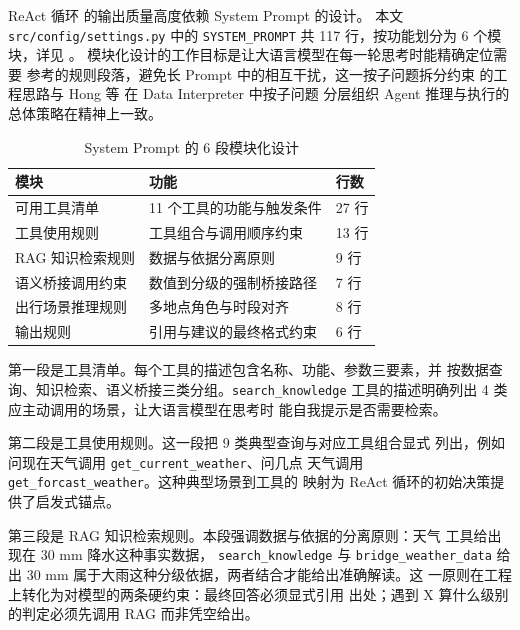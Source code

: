 ReAct 循环 \cite{ref18} 的输出质量高度依赖 System Prompt 的设计。
本文 \texttt{src/\bk{}config/\bk{}settings.\bk{}py} 中的 \texttt{SYSTEM\_\bk{}PROMPT}
共 117 行，按功能划分为 6 个模块，详见 。
模块化设计的工作目标是让大语言模型在每一轮思考时能精确定位需要
参考的规则段落，避免长 Prompt 中的相互干扰，这一按子问题拆分约束
的工程思路与 Hong 等 \cite{ref20} 在 Data Interpreter 中按子问题
分层组织 Agent 推理与执行的总体策略在精神上一致。

\begin{table}[!ht]
    \centering
    \caption{System Prompt 的 6 段模块化设计}
    \label{tab:prompt-modules}
    \song\fontsize{9pt}{12pt}\selectfont
    \renewcommand{\arraystretch}{0.95}
    \begin{tabular}{lll}
        \toprule
        模块 & 功能 & 行数 \\
        \midrule
        可用工具清单 & 11 个工具的功能与触发条件 & 27 行 \\
        工具使用规则 & 工具组合与调用顺序约束 & 13 行 \\
        RAG 知识检索规则 & 数据与依据分离原则 & 9 行 \\
        语义桥接调用约束 & 数值到分级的强制桥接路径 & 7 行 \\
        出行场景推理规则 & 多地点角色与时段对齐 & 8 行 \\
        输出规则 & 引用与建议的最终格式约束 & 6 行 \\
        \bottomrule
    \end{tabular}
\end{table}

第一段是工具清单。每个工具的描述包含名称、功能、参数三要素，并
按数据查询、知识检索、语义桥接三类分组。\texttt{search\_\bk{}knowledge}
工具的描述明确列出 4 类应主动调用的场景，让大语言模型在思考时
能自我提示是否需要检索。

第二段是工具使用规则。这一段把 9 类典型查询与对应工具组合显式
列出，例如问现在天气调用 \texttt{get\_\bk{}current\_\bk{}weather}、问几点
天气调用 \texttt{get\_\bk{}forcast\_\bk{}weather}。这种典型场景到工具的
映射为 ReAct 循环的初始决策提供了启发式锚点。

第三段是 RAG 知识检索规则。本段强调数据与依据的分离原则：天气
工具给出现在 30 mm 降水这种事实数据，
\texttt{search\_\bk{}knowledge} 与 \texttt{bridge\_\bk{}weather\_\bk{}data}
给出 30 mm 属于大雨这种分级依据，两者结合才能给出准确解读。这
一原则在工程上转化为对模型的两条硬约束：最终回答必须显式引用
出处；遇到 X 算什么级别的判定必须先调用 RAG 而非凭空给出。

